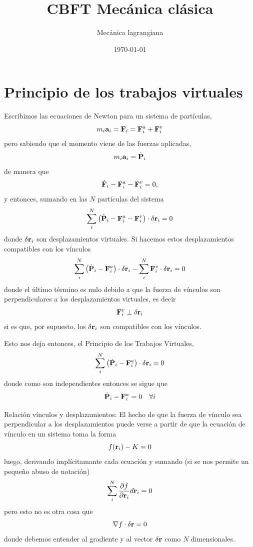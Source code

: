 \documentclass[10pt,oneside]{CBFT_article}
\title{CBFT Mecánica clásica}
\author{Mecánica lagrangiana}
\date{\today}
\begin{document}
\maketitle
\tableofcontents

\section{Principio de los trabajos virtuales}
Escribimos las ecuaciones de Newton para un sistema de partículas,
\[
m_i \vb{a}_i = \vb{F}_i = \vb{F}_i^a + \vb{F}_i^v
\]
pero sabiendo que el momento viene de las fuerzas aplicadas,
\[
m_i \vb{a}_i = \dot{\vb{P}}_i
\]
de manera que 
\[
\dot{\vb{F}}_i - \vb{F}_i^a - \vb{F}_i^v = 0,
\]
y entonces, sumando en las $N$ partículas del sistema
\[
\sum_i^N \left( \dot{\vb{P}}_i - \vb{F}_i^a - \vb{F}_i^v \right) \cdot \delta\vb{r}_i  = 0
\]
donde $\delta\vb{r}_i$ son desplazamientos virtuales. Si hacemos estos desplazamientos
compatibles con los vínculos
\[
\sum_i^N \left( \dot{\vb{P}}_i - \vb{F}_i^a \right) \cdot \delta\vb{r}_i - \sum_i^N  \vb{F}_i^v  \cdot \delta\vb{r}_i  = 0
\]
donde el último término es nulo debido a que la fuerza de vínculos son perpendiculares
a los desplazamientos virtuales, es decir 
\[
\vb{F}_i^v \perp \delta\vb{r}_i
\]
si es que, por supuesto, los $\delta\vb{r}_i$ son compatibles con los vínculos.

Esto nos deja entonces, el Principio de los Trabajos Virtuales,
\[
\sum_i^N \left( \dot{\vb{P}}_i - \vb{F}_i^a \right) \cdot \delta\vb{r}_i = 0 
\]
donde como son independientes entonces se sigue que
\[
\dot{\vb{P}}_i - \vb{F}_i^a = 0 \quad \forall i
\]

\begin{notas}{Relación vínculos y desplazamientos:}
El hecho de que la fuerza de vínculo sea perpendicular a los desplazamientos puede
verse a partir de que la ecuación de vínculo en un sistema toma la forma
\[
f(\vb{r}_i) - K = 0 
\]
luego, derivando implícitamante cada ecuación y sumando (si se nos permite un pequeño
abuso de notación)
\[
\sum_i^N \dpar{f}{\vb{r}_i} d\vb{r}_i = 0 
\]
pero esto no es otra cosa que
\[
\nabla f \cdot \vb{\delta r} = 0
\]
donde debemos entender al gradiente y al vector $\vb{\delta r}$ como $N$ dimensionales.
\end{notas}
\end{document}
